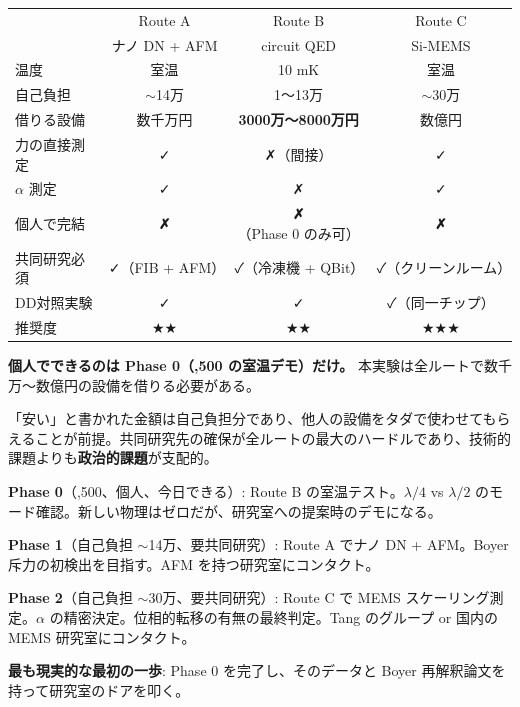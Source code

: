 \documentclass[12pt,a4paper]{article}
\begin{document}
\begin{center}
\renewcommand{\arraystretch}{1.4}
\begin{tabular}{lccc}
\toprule
& Route A & Route B & Route C \\
& ナノ DN + AFM & circuit QED & Si-MEMS \\
\midrule
温度 & 室温 & 10 mK & 室温 \\
自己負担 & $\sim$14万 & 1〜13万 & $\sim$30万 \\
借りる設備 & 数千万円 & \textbf{3000万〜8000万円} & 数億円 \\
力の直接測定 & ✓ & ✗（間接） & ✓ \\
$\alpha$ 測定 & ✓ & ✗ & ✓ \\
個人で完結 & \textbf{✗} & \textbf{✗}（Phase 0 のみ可） & \textbf{✗} \\
共同研究必須 & ✓（FIB + AFM） & ✓（冷凍機 + QBit）& ✓（クリーンルーム）\\
DD対照実験 & ✓ & ✓ & ✓（同一チップ）\\
\midrule
推奨度 & ★★ & ★★ & ★★★ \\
\bottomrule
\end{tabular}
\end{center}

\begin{honestbox}[現実: 全ルートが共同研究前提]
\textbf{個人でできるのは Phase 0（,500 の室温デモ）だけ。}
本実験は全ルートで数千万〜数億円の設備を借りる必要がある。

「安い」と書かれた金額は自己負担分であり、他人の設備をタダで使わせてもらえることが前提。共同研究先の確保が全ルートの最大のハードルであり、技術的課題よりも\textbf{政治的課題}が支配的。
\end{honestbox}

\begin{resultbox}[推奨戦略]
\textbf{Phase 0}（,500、個人、今日できる）: Route B の室温テスト。$\lambda/4$ vs $\lambda/2$ のモード確認。新しい物理はゼロだが、研究室への提案時のデモになる。

\textbf{Phase 1}（自己負担 $\sim$14万、要共同研究）: Route A でナノ DN + AFM。Boyer 斥力の初検出を目指す。AFM を持つ研究室にコンタクト。

\textbf{Phase 2}（自己負担 $\sim$30万、要共同研究）: Route C で MEMS スケーリング測定。$\alpha$ の精密決定。位相的転移の有無の最終判定。Tang のグループ or 国内の MEMS 研究室にコンタクト。

\textbf{最も現実的な最初の一歩}: Phase 0 を完了し、そのデータと Boyer 再解釈論文を持って研究室のドアを叩く。
\end{resultbox}
\end{document}
